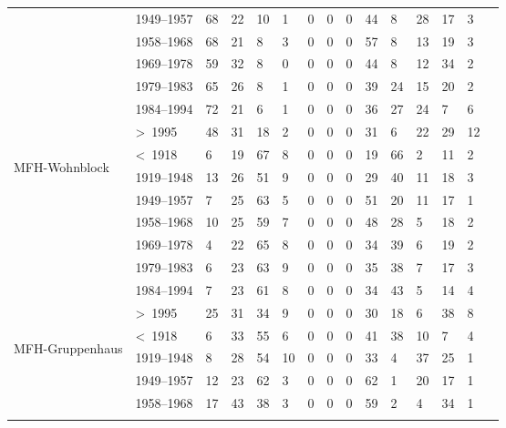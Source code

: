 \begin{longtable}{ll | lllllll | lllll | l}
\begin{tabular}{ll | lllllll | lllll | l}
&1949--1957  & 68 & 22 & 10 & 1 & 0 & 0 & 0 & 44 & 8 & 28 & 17 & 3 \\ 
&1958--1968  & 68 & 21 & 8 & 3 & 0 & 0 & 0 & 57 & 8 & 13 & 19 & 3 \\ 
&1969--1978  & 59 & 32 & 8 & 0 & 0 & 0 & 0 & 44 & 8 & 12 & 34 & 2 \\ 
&1979--1983  & 65 & 26 & 8 & 1 & 0 & 0 & 0 & 39 & 24 & 15 & 20 & 2 \\ 
&1984--1994  & 72 & 21 & 6 & 1 & 0 & 0 & 0 & 36 & 27 & 24 & 7 & 6 \\ 
&\textgreater~1995     & 48 & 31 & 18 & 2 & 0 & 0 & 0 & 31 & 6 & 22 & 29 & 12 \\ 
\cmidrule{1-14}
\multirow{8}{*}{\begin{sideways} MFH-Wohnblock \end{sideways}}
\multirow{8}{*}{\begin{sideways} Block family house \end{sideways}}
&\textless~1918     & 6 & 19 & 67 & 8 & 0 & 0 & 0 & 19 & 66 & 2 & 11 & 2 \\ 
&1919--1948  & 13 & 26 & 51 & 9 & 0 & 0 & 0 & 29 & 40 & 11 & 18 & 3 \\ 
&1949--1957  & 7 & 25 & 63 & 5 & 0 & 0 & 0 & 51 & 20 & 11 & 17 & 1 \\ 
&1958--1968  & 10 & 25 & 59 & 7 & 0 & 0 & 0 & 48 & 28 & 5 & 18 & 2 \\ 
&1969--1978  & 4 & 22 & 65 & 8 & 0 & 0 & 0 & 34 & 39 & 6 & 19 & 2 \\ 
&1979--1983  & 6 & 23 & 63 & 9 & 0 & 0 & 0 & 35 & 38 & 7 & 17 & 3 \\ 
&1984--1994  & 7 & 23 & 61 & 8 & 0 & 0 & 0 & 34 & 43 & 5 & 14 & 4 \\ 
&\textgreater~1995     & 25 & 31 & 34 & 9 & 0 & 0 & 0 & 30 & 18 & 6 & 38 & 8 \\ 
\cmidrule{1-14}
\multirow{8}{*}{\begin{sideways} MFH-Gruppenhaus \end{sideways}}
\multirow{8}{*}{\begin{sideways} Group family house \end{sideways}}
&\textless~1918     & 6 & 33 & 55 & 6 & 0 & 0 & 0 & 41 & 38 & 10 & 7 & 4 \\ 
&1919--1948  & 8 & 28 & 54 & 10 & 0 & 0 & 0 & 33 & 4 & 37 & 25 & 1 \\ 
&1949--1957  & 12 & 23 & 62 & 3 & 0 & 0 & 0 & 62 & 1 & 20 & 17 & 1 \\ 
&1958--1968  & 17 & 43 & 38 & 3 & 0 & 0 & 0 & 59 & 2 & 4 & 34 & 1 \\ 

\end{tabular}
\end{longtable}
